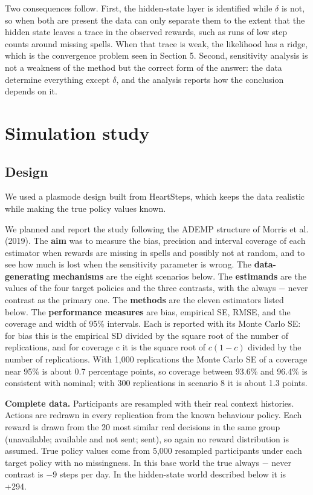 \documentclass[12pt]{article}
\begin{document}
Two consequences follow. First, the hidden-state layer is identified while $\delta$ is not, so when both are present the data can only separate them to the extent that the hidden state leaves a trace in the observed rewards, such as runs of low step counts around missing spells. When that trace is weak, the likelihood has a ridge, which is the convergence problem seen in Section 5. Second, sensitivity analysis is not a weakness of the method but the correct form of the answer: the data determine everything except $\delta$, and the analysis reports how the conclusion depends on it.

\section{Simulation study}

\subsection{Design}

We used a plasmode design built from HeartSteps, which keeps the data realistic while making the true policy values known.

We planned and report the study following the ADEMP structure of Morris et al. (2019). The \textbf{aim} was to measure the bias, precision and interval coverage of each estimator when rewards are missing in spells and possibly not at random, and to see how much is lost when the sensitivity parameter is wrong. The \textbf{data-generating mechanisms} are the eight scenarios below. The \textbf{estimands} are the values of the four target policies and the three contrasts, with the always $-$ never contrast as the primary one. The \textbf{methods} are the eleven estimators listed below. The \textbf{performance measures} are bias, empirical SE, RMSE, and the coverage and width of 95\% intervals. Each is reported with its Monte Carlo SE: for bias this is the empirical SD divided by the square root of the number of replications, and for coverage c it is the square root of $c(1-c)$ divided by the number of replications. With 1,000 replications the Monte Carlo SE of a coverage near 95\% is about 0.7 percentage points, so coverage between 93.6\% and 96.4\% is consistent with nominal; with 300 replications in scenario 8 it is about 1.3 points.

\textbf{Complete data.} Participants are resampled with their real context histories. Actions are redrawn in every replication from the known behaviour policy. Each reward is drawn from the 20 most similar real decisions in the same group (unavailable; available and not sent; sent), so again no reward distribution is assumed. True policy values come from 5,000 resampled participants under each target policy with no missingness. In this base world the true always $-$ never contrast is $-$9 steps per day. In the hidden-state world described below it is +294.
\end{document}
